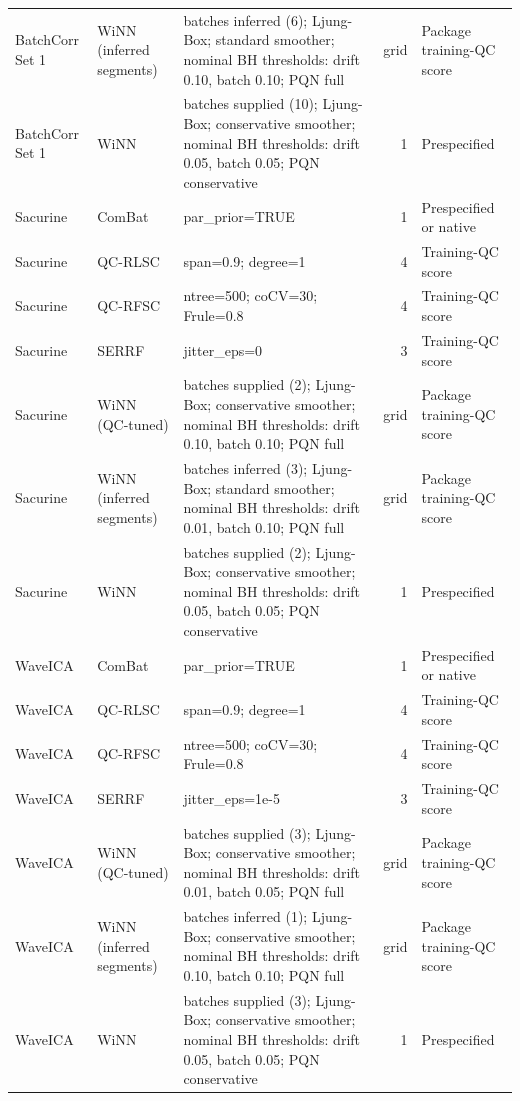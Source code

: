 \begin{landscape}
\begin{longtable}{p{2.6cm}p{3.4cm}p{9.6cm}rp{3.6cm}}
BatchCorr Set 1 & WiNN (inferred segments) & batches inferred (6); Ljung-Box; standard smoother; nominal BH thresholds: drift 0.10, batch 0.10; PQN full & grid & Package training-QC score \\
BatchCorr Set 1 & WiNN & batches supplied (10); Ljung-Box; conservative smoother; nominal BH thresholds: drift 0.05, batch 0.05; PQN conservative & 1 & Prespecified \\
\midrule
Sacurine & ComBat & par\_prior=TRUE & 1 & Prespecified or native \\
Sacurine & QC-RLSC & span=0.9; degree=1 & 4 & Training-QC score \\
Sacurine & QC-RFSC & ntree=500; coCV=30; Frule=0.8 & 4 & Training-QC score \\
Sacurine & SERRF & jitter\_eps=0 & 3 & Training-QC score \\
Sacurine & WiNN (QC-tuned) & batches supplied (2); Ljung-Box; conservative smoother; nominal BH thresholds: drift 0.10, batch 0.10; PQN full & grid & Package training-QC score \\
Sacurine & WiNN (inferred segments) & batches inferred (3); Ljung-Box; standard smoother; nominal BH thresholds: drift 0.01, batch 0.10; PQN full & grid & Package training-QC score \\
Sacurine & WiNN & batches supplied (2); Ljung-Box; conservative smoother; nominal BH thresholds: drift 0.05, batch 0.05; PQN conservative & 1 & Prespecified \\
\midrule
WaveICA & ComBat & par\_prior=TRUE & 1 & Prespecified or native \\
WaveICA & QC-RLSC & span=0.9; degree=1 & 4 & Training-QC score \\
WaveICA & QC-RFSC & ntree=500; coCV=30; Frule=0.8 & 4 & Training-QC score \\
WaveICA & SERRF & jitter\_eps=1e-5 & 3 & Training-QC score \\
WaveICA & WiNN (QC-tuned) & batches supplied (3); Ljung-Box; conservative smoother; nominal BH thresholds: drift 0.01, batch 0.05; PQN full & grid & Package training-QC score \\
WaveICA & WiNN (inferred segments) & batches inferred (1); Ljung-Box; conservative smoother; nominal BH thresholds: drift 0.10, batch 0.10; PQN full & grid & Package training-QC score \\
WaveICA & WiNN & batches supplied (3); Ljung-Box; conservative smoother; nominal BH thresholds: drift 0.05, batch 0.05; PQN conservative & 1 & Prespecified \\
\end{longtable}
\end{landscape}

